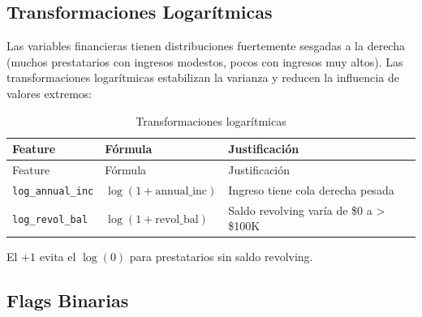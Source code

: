 \documentclass[
  spanish,
  11pt,
  letterpaper,
]{scrbook}
\theoremstyle{plain}
\theoremstyle{remark}
\begin{document}
\subsection{Transformaciones
Logarítmicas}\label{transformaciones-logaruxedtmicas}

Las variables financieras tienen distribuciones fuertemente sesgadas a
la derecha (muchos prestatarios con ingresos modestos, pocos con
ingresos muy altos). Las transformaciones logarítmicas estabilizan la
varianza y reducen la influencia de valores extremos:

\begin{longtable}[]{@{}
  >{\raggedright\arraybackslash}p{}
  >{\raggedright\arraybackslash}p{}
  >{\raggedright\arraybackslash}p{}@{}}
\caption{Transformaciones
logarítmicas}\label{tbl-log-features}\tabularnewline
\toprule\noalign{}
\begin{minipage}[b]{\linewidth}\raggedright
Feature
\end{minipage} & \begin{minipage}[b]{\linewidth}\raggedright
Fórmula
\end{minipage} & \begin{minipage}[b]{\linewidth}\raggedright
Justificación
\end{minipage} \\
\midrule\noalign{}
\endfirsthead
\toprule\noalign{}
\begin{minipage}[b]{\linewidth}\raggedright
Feature
\end{minipage} & \begin{minipage}[b]{\linewidth}\raggedright
Fórmula
\end{minipage} & \begin{minipage}[b]{\linewidth}\raggedright
Justificación
\end{minipage} \\
\midrule\noalign{}
\endhead
\bottomrule\noalign{}
\endlastfoot
\texttt{log\_annual\_inc} & \(\log(1 + \text{annual\_inc})\) & Ingreso
tiene cola derecha pesada \\
\texttt{log\_revol\_bal} & \(\log(1 + \text{revol\_bal})\) & Saldo
revolving varía de \$0 a \textgreater{} \$100K \\
\end{longtable}

El \(+1\) evita el \(\log(0)\) para prestatarios sin saldo revolving.

\subsection{Flags Binarias}\label{flags-binarias}
\end{document}

